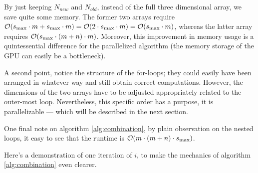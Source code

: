 \documentclass[a4paper]{article}
\begin{document}
By just keeping $N_{new}$ and $N_{old}$, instead of the full three dimensional array, we save quite some memory. The former two arrays require $\mathcal{O}(s_{\rm max} \cdot m + s_{\rm max} \cdot m) = \mathcal{O}( 2 \cdot s_{\rm max} \cdot m)=\mathcal{O}(s_{\rm max} \cdot m)$, whereas the latter array requires $\mathcal{O}(s_{\rm max} \cdot (m+n) \cdot m)$. Moreover, this improvement in memory usage is a quintessential difference for the parallelized algorithm (the memory storage of the GPU can easily be a bottleneck).

A second point, notice the structure of the for-loops; they could easily have been arranged in whatever way and still obtain correct computations. However, the dimensions of the two arrays have to be adjusted appropriately related to the outer-most loop. Nevertheless, this specific order has a purpose, it is parallelizable --- which will be described in the next section.

One final note on algorithm \ref{alg:combination}, by plain observation on the nested loops, it easy to see that the runtime is $\mathcal{O}(m\cdot (m+n)\cdot s_{\rm max})$.

Here's a demonstration of one iteration of $i$, to make the mechanics of algorithm \ref{alg:combination} even clearer.
\end{document}
